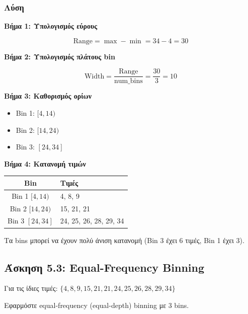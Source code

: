 \subsubsection*{Λύση}

\textbf{Βήμα 1: Υπολογισμός εύρους}

$$\text{Range} = \max - \min = 34 - 4 = 30$$

\textbf{Βήμα 2: Υπολογισμός πλάτους bin}

$$\text{Width} = \frac{\text{Range}}{\text{num\_bins}} = \frac{30}{3} = 10$$

\textbf{Βήμα 3: Καθορισμός ορίων}

\begin{itemize}
    \item Bin 1: $[4, 14)$
    \item Bin 2: $[14, 24)$
    \item Bin 3: $[24, 34]$
\end{itemize}

\textbf{Βήμα 4: Κατανομή τιμών}

\begin{center}
\begin{tabular}{cl}
\toprule
\textbf{Bin} & \textbf{Τιμές} \\
\midrule
Bin 1 $[4, 14)$ & 4, 8, 9 \\
Bin 2 $[14, 24)$ & 15, 21, 21 \\
Bin 3 $[24, 34]$ & 24, 25, 26, 28, 29, 34 \\
\bottomrule
\end{tabular}
\end{center}

\begin{warningbox}
Τα bins μπορεί να έχουν πολύ άνιση κατανομή (Bin 3 έχει 6 τιμές, Bin 1 έχει 3).
\end{warningbox}

\subsection{Άσκηση 5.3: Equal-Frequency Binning}

\begin{formulabox}[Εκφώνηση]
Για τις ίδιες τιμές: $\{4, 8, 9, 15, 21, 21, 24, 25, 26, 28, 29, 34\}$

Εφαρμόστε equal-frequency (equal-depth) binning με 3 bins.
\end{formulabox}

